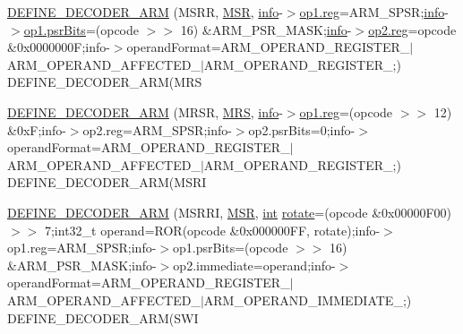 \begin{DoxyCompactItemize}
\item 
\mbox{\hyperlink{decoder-arm_8c_a84d8d1555643e38f9f04a47e47d84a23}{D\+E\+F\+I\+N\+E\+\_\+\+D\+E\+C\+O\+D\+E\+R\+\_\+\+A\+RM}} (M\+S\+RR, \mbox{\hyperlink{decoder-arm_8c_ad9c5d760c45ba502ddfe54752058d02e}{M\+SR}}, \mbox{\hyperlink{libretro_8h_a283ad41e4809f9c0ebe736a9861d8a91}{info}}-\/$>$\mbox{\hyperlink{lr35902_2decoder_8c_af44c02f7785479603f59b662f3dfae6a}{op1.\+reg}}=A\+R\+M\+\_\+\+S\+P\+SR;\mbox{\hyperlink{libretro_8h_a283ad41e4809f9c0ebe736a9861d8a91}{info}}-\/$>$\mbox{\hyperlink{decoder-arm_8c_a69eccd10e3446c8069693353639ba059}{op1.\+psr\+Bits}}=(opcode $>$$>$ 16) \&A\+R\+M\+\_\+\+P\+S\+R\+\_\+\+M\+A\+SK;\mbox{\hyperlink{libretro_8h_a283ad41e4809f9c0ebe736a9861d8a91}{info}}-\/$>$\mbox{\hyperlink{lr35902_2decoder_8c_af44c02f7785479603f59b662f3dfae6a}{op2.\+reg}}=opcode \&0x0000000\+F;info-\/$>$operand\+Format=\+A\+R\+M\+\_\+\+O\+P\+E\+R\+A\+N\+D\+\_\+\+R\+E\+G\+I\+S\+T\+E\+R\+\_$\vert$\+A\+R\+M\+\_\+\+O\+P\+E\+R\+A\+N\+D\+\_\+\+A\+F\+F\+E\+C\+T\+E\+D\+\_$\vert$\+A\+R\+M\+\_\+\+O\+P\+E\+R\+A\+N\+D\+\_\+\+R\+E\+G\+I\+S\+T\+E\+R\+\_;) D\+E\+F\+I\+N\+E\+\_\+\+D\+E\+C\+O\+D\+E\+R\+\_\+\+A\+R\+M(\+M\+RS
\item 
\mbox{\hyperlink{decoder-arm_8c_a806ab4e8f05768b1189a0c989ecdcd76}{D\+E\+F\+I\+N\+E\+\_\+\+D\+E\+C\+O\+D\+E\+R\+\_\+\+A\+RM}} (M\+R\+SR, \mbox{\hyperlink{decoder-arm_8c_a08e2b0a56adcc93949282d6c828080ff}{M\+RS}}, \mbox{\hyperlink{libretro_8h_a283ad41e4809f9c0ebe736a9861d8a91}{info}}-\/$>$\mbox{\hyperlink{lr35902_2decoder_8c_af44c02f7785479603f59b662f3dfae6a}{op1.\+reg}}=(opcode $>$$>$ 12) \&0x\+F;info-\/$>$op2.\+reg=\+A\+R\+M\+\_\+\+S\+P\+S\+R;info-\/$>$op2.\+psr\+Bits=0;info-\/$>$operand\+Format=\+A\+R\+M\+\_\+\+O\+P\+E\+R\+A\+N\+D\+\_\+\+R\+E\+G\+I\+S\+T\+E\+R\+\_$\vert$\+A\+R\+M\+\_\+\+O\+P\+E\+R\+A\+N\+D\+\_\+\+A\+F\+F\+E\+C\+T\+E\+D\+\_$\vert$\+A\+R\+M\+\_\+\+O\+P\+E\+R\+A\+N\+D\+\_\+\+R\+E\+G\+I\+S\+T\+E\+R\+\_;) D\+E\+F\+I\+N\+E\+\_\+\+D\+E\+C\+O\+D\+E\+R\+\_\+\+A\+R\+M(\+M\+S\+RI
\item 
\mbox{\hyperlink{decoder-arm_8c_a106888d09814f6e89f6d4e35097a4165}{D\+E\+F\+I\+N\+E\+\_\+\+D\+E\+C\+O\+D\+E\+R\+\_\+\+A\+RM}} (M\+S\+R\+RI, \mbox{\hyperlink{decoder-arm_8c_ad9c5d760c45ba502ddfe54752058d02e}{M\+SR}}, \mbox{\hyperlink{ioapi_8h_a787fa3cf048117ba7123753c1e74fcd6}{int}} \mbox{\hyperlink{gzappend_8c_a4f13e4c742e47380cfb3aa6744ff89a7}{rotate}}=(opcode \&0x00000\+F00) $>$$>$ 7;int32\+\_\+t operand=\+R\+O\+R(opcode \&0x000000\+F\+F, rotate);info-\/$>$op1.\+reg=\+A\+R\+M\+\_\+\+S\+P\+S\+R;info-\/$>$op1.\+psr\+Bits=(opcode $>$$>$ 16) \&\+A\+R\+M\+\_\+\+P\+S\+R\+\_\+\+M\+A\+S\+K;info-\/$>$op2.\+immediate=operand;info-\/$>$operand\+Format=\+A\+R\+M\+\_\+\+O\+P\+E\+R\+A\+N\+D\+\_\+\+R\+E\+G\+I\+S\+T\+E\+R\+\_$\vert$\+A\+R\+M\+\_\+\+O\+P\+E\+R\+A\+N\+D\+\_\+\+A\+F\+F\+E\+C\+T\+E\+D\+\_$\vert$\+A\+R\+M\+\_\+\+O\+P\+E\+R\+A\+N\+D\+\_\+\+I\+M\+M\+E\+D\+I\+A\+T\+E\+\_;) D\+E\+F\+I\+N\+E\+\_\+\+D\+E\+C\+O\+D\+E\+R\+\_\+\+A\+R\+M(\+S\+WI

\end{DoxyCompactItemize}
